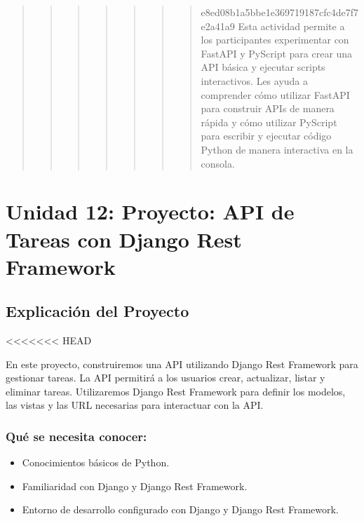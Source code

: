 \documentclass[
  a4paper,
  onepage,
  openany]{scrreprt}
\providecommand{\tightlist}{%
  \setlength{\itemsep}{0pt}\setlength{\parskip}{0pt}}\usepackage{longtable,booktabs,array}
\begin{document}
\begin{quote}
\begin{quote}
\begin{quote}
\begin{quote}
\begin{quote}
\begin{quote}
\begin{quote}
e8ed08b1a5bbe1e369719187cfc4de7f7e2a41a9 Esta actividad permite a los
participantes experimentar con FastAPI y PyScript para crear una API
básica y ejecutar scripts interactivos. Les ayuda a comprender cómo
utilizar FastAPI para construir APIs de manera rápida y cómo utilizar
PyScript para escribir y ejecutar código Python de manera interactiva en
la consola.
\end{quote}
\end{quote}
\end{quote}
\end{quote}
\end{quote}
\end{quote}
\end{quote}

\part{Unidad 12: Proyecto: API de Tareas con Django Rest Framework}

\hypertarget{explicaciuxf3n-del-proyecto}{%
\chapter{Explicación del Proyecto}\label{explicaciuxf3n-del-proyecto}}

\textless\textless\textless\textless\textless\textless\textless{} HEAD

En este proyecto, construiremos una API utilizando Django Rest Framework
para gestionar tareas. La API permitirá a los usuarios crear,
actualizar, listar y eliminar tareas. Utilizaremos Django Rest Framework
para definir los modelos, las vistas y las URL necesarias para
interactuar con la API.

\hypertarget{quuxe9-se-necesita-conocer}{%
\section{Qué se necesita conocer:}\label{quuxe9-se-necesita-conocer}}

\begin{itemize}
\tightlist
\item
  Conocimientos básicos de Python.
\item
  Familiaridad con Django y Django Rest Framework.
\item
  Entorno de desarrollo configurado con Django y Django Rest Framework.
\end{itemize}
\end{document}
